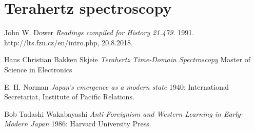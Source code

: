 \documentclass[english,11pt,a4paper]{article}
\numberwithin{equation}{section} %
\numberwithin{figure}{section} %
\numberwithin{table}{section} %
\begin{document}
\section{Terahertz spectroscopy}




\newpage

  \begin{thebibliography}{}

   John W. Dower {\em Readings compiled for History  21.479.}  1991.
     http://lts.fzu.cz/en/intro.php, 20.8.2018.

   Hans Christian Bakken Skjeie {\em Terahertz Time-Domain Spectroscopy} Master of Science in Electronics

   E. H. Norman {\em Japan's emergence as a modern
  state} 1940: International Secretariat, Institute of Pacific
  Relations.

   Bob Tadashi Wakabayashi {\em Anti-Foreignism and Western
  Learning in Early-Modern Japan} 1986: Harvard University Press.

  \end{thebibliography}
\end{document}
